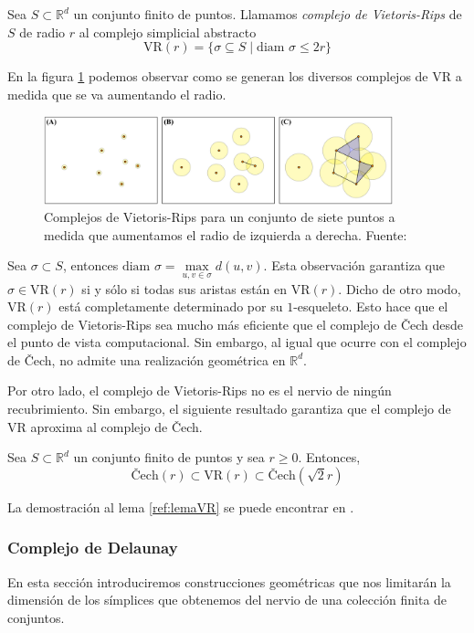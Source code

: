 \begin{definition}
Sea $S \subset \mathbb{R}^d$ un conjunto finito de puntos. Llamamos \emph{complejo de Vietoris-Rips} de $S$ de radio $r$ al complejo simplicial abstracto
\[
\text{VR}(r) = \{\sigma \subseteq  S \mid \text{diam } \sigma \leq 2r\}
\]
\end{definition}

En la figura \ref{ref:vr} podemos observar como se generan los diversos complejos de VR a medida que se va aumentando el radio.

\begin{figure}[!ht]
\centering
\includegraphics[width=0.9\textwidth]{include/figuras/vr.png} 
\caption{Complejos de Vietoris-Rips para un conjunto de siete puntos a medida que aumentamos el radio de izquierda a derecha. Fuente: \cite{Ulmer2019}}
\label{ref:vr}
\end{figure}

Sea $\sigma \subset S$, entonces $\text{diam } \sigma = \max\limits_{u, v \in \sigma} d(u,v)$. Esta observación garantiza que $\sigma \in \text{VR}(r)$ si y sólo si todas sus aristas están en $\text{VR}(r)$. Dicho de otro modo, $\text{VR}(r)$ está completamente determinado por su $1$-esqueleto. Esto hace que el complejo de Vietoris-Rips sea mucho más eficiente que el complejo de \v{C}ech desde el punto de vista computacional. Sin embargo, al igual que ocurre con el complejo de \v{C}ech, no admite una realización geométrica en $\mathbb{R}^d$.

Por otro lado, el complejo de Vietoris-Rips no es el nervio de ningún recubrimiento. Sin embargo, el siguiente resultado garantiza que el complejo de VR aproxima al complejo de \v{C}ech.

\begin{lemma}
\label{ref:lemaVR}
Sea $S \subset \mathbb{R}^d$ un conjunto finito de puntos y sea $r \geq 0$. Entonces,
\[
\text{\v{C}ech}(r) \subset \text{VR}(r) \subset \text{\v{C}ech}(\sqrt{2}r)
\]
\end{lemma}

La demostración al lema \ref{ref:lemaVR} se puede encontrar en \cite{libroEH}.

\subsubsection*{Complejo de Delaunay}
En esta sección introduciremos construcciones geométricas que nos limitarán la dimensión de los símplices que obtenemos del nervio de una colección finita de conjuntos.

